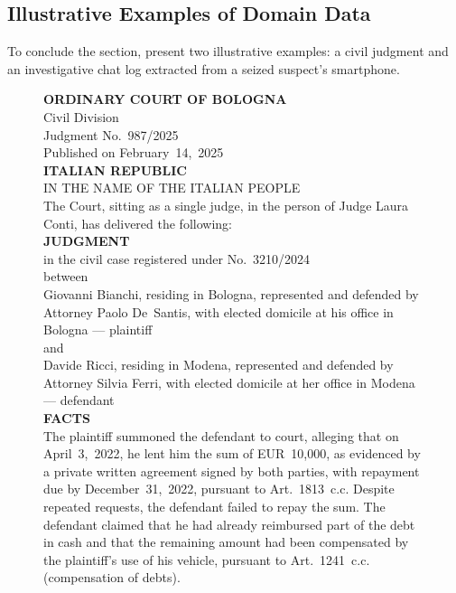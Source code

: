 \subsection{Illustrative Examples of Domain Data}

To conclude the section,  present two illustrative examples: a civil judgment and an investigative chat log extracted from a seized suspect's smartphone.





\begin{figure}[htbp]
\centering
\begin{minipage}{0.9\linewidth}
\small
\textbf{ORDINARY COURT OF BOLOGNA}\\
Civil Division\\
Judgment No.~987/2025\\
Published on February~14,~2025\\[0.5em]
\textbf{ITALIAN REPUBLIC}\\
IN THE NAME OF THE ITALIAN PEOPLE\\[0.5em]
The Court, sitting as a single judge, in the person of Judge Laura Conti, has delivered the following:\\[0.5em]
\textbf{JUDGMENT}\\[0.3em]
in the civil case registered under No.~3210/2024\\
between\\[0.3em]
Giovanni Bianchi, residing in Bologna, represented and defended by Attorney Paolo De~Santis, with elected domicile at his office in Bologna --- plaintiff\\[0.3em]
and\\[0.3em]
Davide Ricci, residing in Modena, represented and defended by Attorney Silvia Ferri, with elected domicile at her office in Modena --- defendant\\[0.5em]

\textbf{FACTS}\\
The plaintiff summoned the defendant to court, alleging that on April~3,~2022, he lent him the sum of EUR~10,000, as evidenced by a private written agreement signed by both parties, with repayment due by December~31,~2022, pursuant to Art.~1813~c.c. Despite repeated requests, the defendant failed to repay the sum. The defendant claimed that he had already reimbursed part of the debt in cash and that the remaining amount had been compensated by the plaintiff's use of his vehicle, pursuant to Art.~1241~c.c. (compensation of debts).\\[0.5em]


\end{minipage}
\end{figure}
